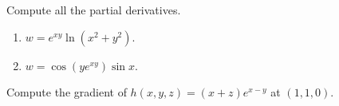 \documentclass[openany]{book}
\begin{document}
\begin{prob}
    Compute all the partial derivatives.
    \begin{enumerate}
        \item $w=e^{xy}\ln(x^2+y^2)$.
        \item $w=\cos(ye^{xy})\sin x$.
    \end{enumerate}
\end{prob}


\begin{prob}
    Compute the gradient of $h(x,y,z)=(x+z)e^{x-y}$ at $(1,1,0)$.
\end{prob}
\end{document}
